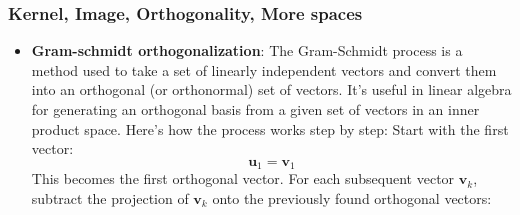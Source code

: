 \documentclass{report}
\begin{document}
    \subsubsection{Kernel, Image, Orthogonality, More spaces}
    \begin{itemize}
         \item \textbf{Gram-schmidt orthogonalization}: The Gram-Schmidt process is a method used to take a set of linearly independent vectors and convert them into an orthogonal (or orthonormal) set of vectors. It's useful in linear algebra for generating an orthogonal basis from a given set of vectors in an inner product space. Here's how the process works step by step:
            \bigbreak \noindent 
            Start with the first vector:
            \[
                \mathbf{u}_1 = \mathbf{v}_1
            \]
            This becomes the first orthogonal vector.
            \bigbreak \noindent 
            For each subsequent vector \( \mathbf{v}_k \),
            \bigbreak \noindent 
            subtract the projection of \( \mathbf{v}_k \) onto the previously found orthogonal vectors:


\end{itemize}
\end{document}
